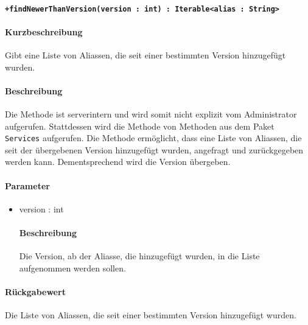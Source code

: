 \paragraph*{\texttt{+findNewerThanVersion(version : int) : Iterable<alias : String>}}%
\paragraph*{Kurzbeschreibung}
Gibt eine Liste von Aliassen, die seit einer bestimmten Version hinzugefügt wurden.
\paragraph*{Beschreibung}
Die Methode ist serverintern und wird somit nicht explizit vom Administrator aufgerufen.
Stattdessen wird die Methode von Methoden aus dem Paket \texttt{Services} aufgerufen.
Die Methode ermöglicht, dass eine Liste von Aliassen, die seit der übergebenen Version hinzugefügt wurden, angefragt und zurückgegeben werden kann.
Dementsprechend wird die Version übergeben.
\paragraph*{Parameter}
\begin{itemize}
    \item version : int
    		\paragraph*{Beschreibung}
    		Die Version, ab der Aliasse, die hinzugefügt wurden, in die Liste aufgenommen werden sollen.
\end{itemize}
\paragraph*{Rückgabewert}
Die Liste von Aliassen, die seit einer bestimmten Version hinzugefügt wurden.
